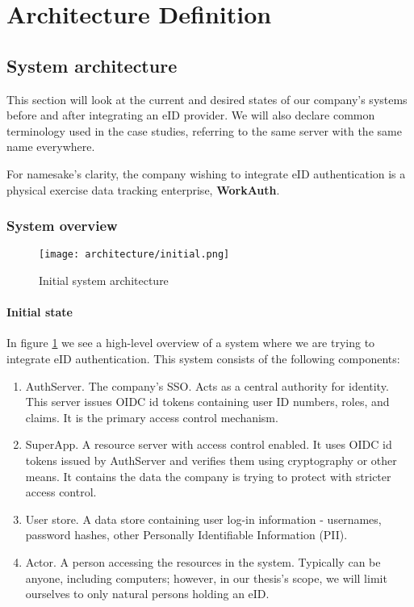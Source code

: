 \section{Architecture Definition}


\subsection{System architecture}

This section will look at the current and desired states of our company's systems before and after integrating an eID provider. We will also declare common terminology used in the case studies, referring to the same server with the same name everywhere.

For namesake's clarity, the company wishing to integrate eID authentication is a physical exercise data tracking enterprise, \textbf{WorkAuth}.

\subsubsection{System overview}

\begin{figure}
  \centering
  \texttt{[image: architecture/initial.png]}
  \caption{Initial system architecture}
  \label{fig:sys-highlevel}
\end{figure}


\paragraph{Initial state}

In figure \ref{fig:sys-highlevel} we see a high-level overview of a system where we are trying to integrate eID authentication. This system consists of the following components:

\begin{enumerate}
  \item AuthServer. The company's SSO. Acts as a central authority for identity. This server issues OIDC id tokens containing user ID numbers, roles, and claims. It is the primary access control mechanism.
  \item SuperApp. A resource server with access control enabled. It uses OIDC id tokens issued by AuthServer and verifies them using cryptography or other means. It contains the data the company is trying to protect with stricter access control.
  \item User store. A data store containing user log-in information - usernames, password hashes, other Personally Identifiable Information (PII).
  \item Actor. A person accessing the resources in the system. Typically can be anyone, including computers; however, in our thesis's scope, we will limit ourselves to only natural persons holding an eID.
\end{enumerate}

